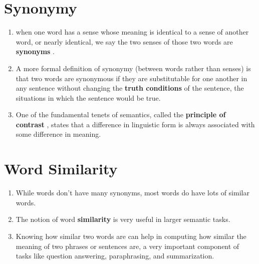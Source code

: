 \section{Synonymy \cite{nlp-1}}\label{Synonymy}
\begin{enumerate}
    \item when one word has a sense whose meaning is identical to a sense of another word, or nearly identical, we say the two senses of those two words are \textbf{synonyms} .

    \item A more formal definition of synonymy (between words rather than senses) is that two words are synonymous if they are substitutable for one another in any sentence without changing the \textbf{truth conditions} of the sentence, the situations in which the sentence would be true.

    \item One of the fundamental tenets of semantics, called the \textbf{principle of contrast} , states that a difference in linguistic form is always associated with some difference in meaning.
\end{enumerate}


\section{Word Similarity \cite{nlp-1}}\label{Word Similarity}
\begin{enumerate}
    \item While words don’t have many synonyms, most words do have lots of similar words.
    
    \item The notion of word \textbf{similarity} is very useful in larger semantic tasks.

    \item Knowing how similar two words are can help in computing how similar the meaning of two phrases or sentences are, a very important component of tasks like question answering, paraphrasing, and summarization.

    
\end{enumerate}

